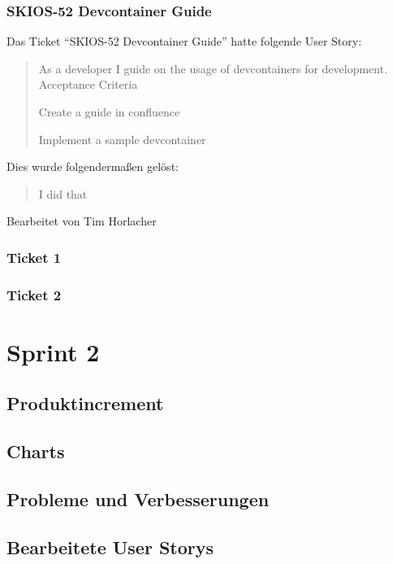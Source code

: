 \subsubsection{SKIOS-52 Devcontainer Guide}
Das Ticket \enquote{SKIOS-52 Devcontainer Guide} hatte folgende User Story:
\begin{quotation}
    As a developer I guide on the usage of devcontainers for development.
Acceptance Criteria

    Create a guide in confluence

    Implement a sample devcontainer
\end{quotation}
Dies wurde folgendermaßen gelöst:
\begin{quotation}
    I did that
\end{quotation}
Bearbeitet von Tim Horlacher

\subsubsection{Ticket 1}

\subsubsection{Ticket 2}

\section{Sprint 2}
\subsection{Produktincrement}
\subsection{Charts}
\subsection{Probleme und Verbesserungen}


\subsection{Bearbeitete User Storys}


